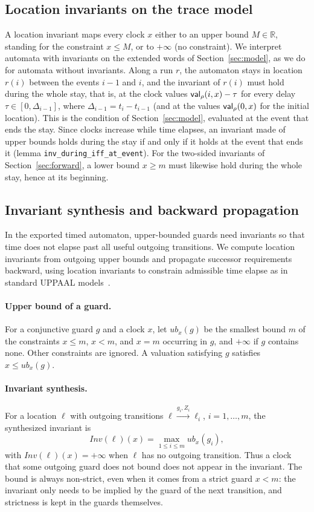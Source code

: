\subsection{Location invariants on the trace model}
\label{sec:inv-semantics}
A location invariant maps every clock $x$ either to an upper bound
$M\in\mathbb R$, standing for the constraint $x\le M$, or to $+\infty$ (no
constraint).  We interpret automata with invariants on the extended words of
Section~\ref{sec:model}, as we do for automata without invariants.
Along a run $r$, the automaton stays in location $r(i)$ between the events
$i-1$ and $i$, and the invariant of $r(i)$ must hold during the whole stay,
that is, at the clock values $\mathsf{val}_\rho(i,x)-\tau$ for every delay
$\tau\in[0,\Delta_{i-1}]$, where $\Delta_{i-1}=t_i-t_{i-1}$ (and at the values $\mathsf{val}_\rho(0,x)$ for the
initial location).  This is the condition of Section~\ref{sec:model}, evaluated at
the event that ends the stay.  Since clocks increase while time elapses, an
invariant made of upper bounds holds during the stay if and only if it holds at
the event that ends it (lemma \texttt{inv\_\allowbreak{}during\_\allowbreak{}iff\_\allowbreak{}at\_\allowbreak{}event}).
For the two-sided invariants of Section~\ref{sec:forward}, a lower bound
$x\ge m$ must likewise hold during the whole stay, hence at its beginning.

\subsection{Invariant synthesis and backward propagation}
\label{sec:uppaal-invariants}\label{sec:main-invariants}
In the exported timed automaton, upper-bounded guards need invariants so that
time does not elapse past all useful outgoing transitions.  We compute location
invariants from outgoing upper bounds and propagate successor requirements
backward, using location invariants to constrain admissible time elapse as in
standard UPPAAL models~\cite{[BGD04]}.

\paragraph{Upper bound of a guard.}
For a conjunctive guard $g$ and a clock $x$, let $\mathit{ub}_x(g)$ be the
smallest bound $m$ of the constraints $x\le m$, $x<m$, and $x=m$ occurring in
$g$, and $+\infty$ if $g$ contains none.  Other constraints are ignored.  A
valuation satisfying $g$ satisfies $x\le\mathit{ub}_x(g)$.

\paragraph{Invariant synthesis.}
For a location $\ell$ with outgoing transitions
$\ell\xrightarrow{g_i,Z_i}\ell_i$, $i=1,\dots,m$, the synthesized invariant is
\[
  \mathit{Inv}(\ell)(x)=\max_{1\le i\le m}\mathit{ub}_x(g_i),
\]
with $\mathit{Inv}(\ell)(x)=+\infty$ when $\ell$ has no outgoing transition.
Thus a clock that some outgoing guard does not bound does not appear in the
invariant.  The bound is always non-strict, even when it comes from a strict
guard $x<m$: the invariant only needs to be implied by the guard of the next
transition, and strictness is kept in the guards themselves.

